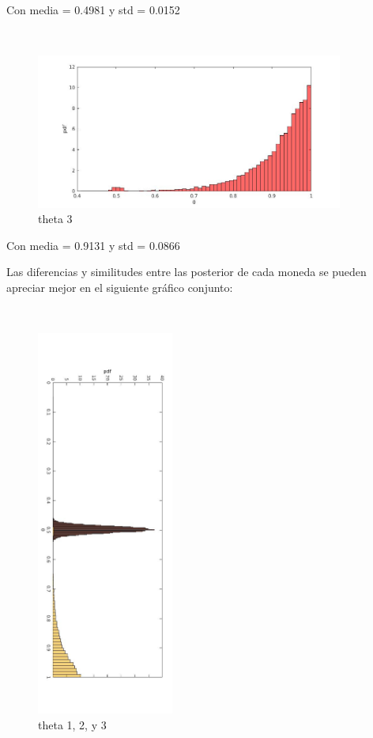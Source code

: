 Con media = 0.4981 y std = 0.0152

~\\
\begin{figure}[h]
    \includegraphics[width=0.9\textwidth]{imagenes/theta3.jpg}
  \caption{theta 3}
\end{figure}

Con media = 0.9131 y std = 0.0866

\newpage

Las diferencias y similitudes entre las posterior de cada moneda se pueden apreciar mejor en el siguiente gráfico conjunto:

~\\
\begin{figure}[h]
    \includegraphics[width=0.4\textwidth]{imagenes/conjunta.jpg}
  \caption{theta 1, 2, y 3}
\end{figure}
~\\

